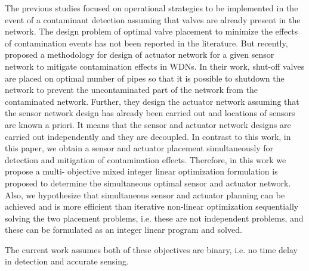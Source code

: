 \documentclass[authoryear,preprint,review,12pt]{elsarticle}
\begin{document}
The previous studies focused on operational strategies to be implemented in the event
of a contaminant detection assuming that valves are already present in the network.
The design problem of optimal valve placement to minimize  the
effects of  contamination events has not been reported in the literature.
But recently, \cite{palleti_actuator_2018} proposed a methodology for design of actuator network
for a given sensor network to mitigate contamination effects in
WDNs. In their work, shut-off valves
are placed on optimal number of pipes so that it
is possible to shutdown the network to prevent the uncontaminated
part of the network from the contaminated network.  Further, they design the actuator
network assuming that the sensor network design has already been carried out and locations of
sensors are known a priori. It means that the sensor and actuator network designs
are carried out independently and they are decoupled.  In contrast to this work,
in this paper, we obtain a sensor and actuator placement simultaneously for detection and
mitigation of contamination effects.  Therefore, in this work we propose a multi-
objective mixed integer linear optimization formulation is proposed to determine the simultaneous
optimal sensor and actuator network. Also, we hypothesize that simultaneous sensor
and actuator planning can be achieved and is more efficient than
iterative non-linear optimization sequentially solving the two placement problems,
i.e. these are not independent problems, and these can be formulated as an integer
linear program and solved.


%
%
 The current work assumes both of these objectives are binary, i.e. no time delay in detection and accurate sensing.
%
%
%
\end{document}
